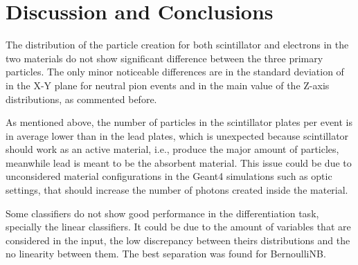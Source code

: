\chapter{Discussion and Conclusions}

The distribution of the particle creation for both scintillator and electrons
in the two materials do not show significant difference between the three
primary particles. The only minor noticeable differences are in the standard
deviation of in the X-Y plane for neutral pion events and in the main value of
the Z-axis distributions, as commented before.

As mentioned above, the number of particles in the scintillator plates per
event is in average lower than in the lead plates, which is unexpected because
scintillator should work as an active material, i.e., produce the major amount
of particles, meanwhile lead is meant to be the absorbent
material\cite{omelaenko2000lhcb}. This issue could be due to unconsidered
material configurations in the Geant4 simulations such as optic settings, that
should increase the number of photons created inside the material.

Some classifiers do not show good performance in the differentiation task,
specially the linear classifiers. It could be due to the amount of variables
that are considered in the input, the low discrepancy between theirs
distributions and the no linearity between them. The best separation was found
for BernoulliNB.
